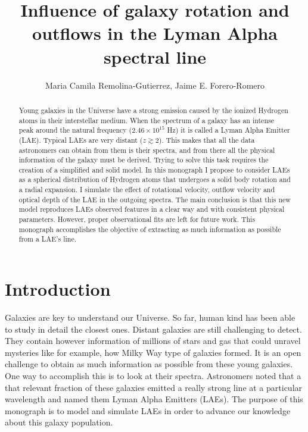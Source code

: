 \documentclass[twocolappendix]{latex/emulateapj}
\begin{document}
\title{Influence of galaxy rotation and outflows in the Lyman Alpha spectral line}


\author{Maria Camila Remolina-Gutierrez, Jaime E. Forero-Romero} 


\begin{abstract}
\noindent Young galaxies in the Universe have a strong \lya emission caused by the ionized Hydrogen atoms in their interstellar medium. When the spectrum of a galaxy has an intense peak around the \lya natural frequency ($2.46\times 10^{15}$ Hz) it is called a Lyman Alpha Emitter (LAE). Typical LAEs are very distant ($z \gtrsim 2$). This makes that all the data astronomers can obtain from them is their spectra, and from there all the physical information of the galaxy must be derived. Trying to solve this task requires the creation of a simplified and solid model. In this monograph I propose to consider LAEs as a spherical distribution of Hydrogen atoms that undergoes a solid body rotation and a radial expansion. I simulate the effect of rotational velocity, outflow velocity and optical depth of the LAE in the outgoing spectra. The main conclusion is that this new model reproduces LAEs observed features in a clear way and with consistent physical parameters. However, proper observational fits are left for future work. This monograph accomplishes the objective of extracting as much information as possible from a LAE's \lya line.
\end{abstract}

\section{Introduction}
\label{sec:intro}

Galaxies are key to understand our Universe. So far, human kind has been able to study in detail the closest ones. Distant galaxies are still challenging to detect. They contain however information of millions of stars and gas that could unravel mysteries like for example, how Milky Way type of galaxies formed. It is an open challenge to obtain as much information as possible from these young galaxies. One way to accomplish this is to look at their spectra. Astronomers noted that a that relevant fraction of these galaxies emitted a really strong line at a particular wavelength and named them Lyman Alpha Emitters (LAEs). The purpose of this monograph is to model and simulate LAEs in order to advance our knowledge about this galaxy population. \\
\end{document}
